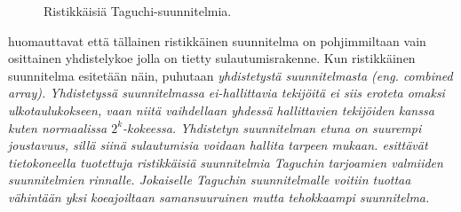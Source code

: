\documentclass[12pt,a4paper,finnish]{tutthesis}
\begin{document}
\begin{figure}
  \begin{center}

    \caption[Ristikkäisiä suunnitelmia]{Ristikkäisiä Taguchi-suunnitelmia.}

    \label{fig:prosessi}
  \end{center}
\end{figure}




\textcite{shoemaker1991} huomauttavat että tällainen ristikkäinen
suunnitelma on pohjimmiltaan vain osittainen yhdistelykoe jolla
on tietty sulautumisrakenne. Kun ristikkäinen suunnitelma esitetään
näin, puhutaan \em yhdistetystä suunnitelmasta \em (eng. \em combined
array\em). Yhdistetyssä suunnitelmassa ei-hallittavia
tekijöitä ei siis eroteta omaksi ulkotaulukokseen, vaan niitä vaihdellaan yhdessä hallittavien
tekijöiden kanssa kuten normaalissa \(2^k\)-kokeessa.
Yhdistetyn suunnitelman etuna on suurempi joustavuus, sillä siinä sulautumisia
voidaan hallita tarpeen mukaan.
\textcite{Hijar-Rivera2009} esittävät tietokoneella tuotettuja ristikkäisiä
suunnitelmia Taguchin tarjoamien valmiiden suunnitelmien rinnalle.
Jokaiselle Taguchin suunnitelmalle voitiin tuottaa vähintään yksi koeajoiltaan samansuuruinen
mutta tehokkaampi suunnitelma.
\end{document}
